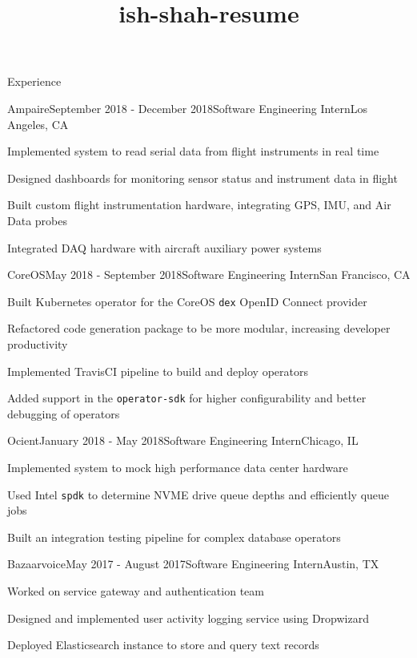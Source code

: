 \documentclass{resume} %
\title{ish-shah-resume}
\begin{document}
    
    \begin{rSection}{Experience}
    
    \begin{rSubsection}{Ampaire}{September 2018 - December 2018}{Software Engineering Intern}{Los Angeles, CA}
    \item Implemented system to read serial data from flight instruments in real time
    \item Designed dashboards for monitoring sensor status and instrument data in flight
    \item Built custom flight instrumentation hardware, integrating GPS, IMU, and Air Data probes
    \item Integrated DAQ hardware with aircraft auxiliary power systems
    \end{rSubsection}
    
    \begin{rSubsection}{CoreOS}{May 2018 - September 2018}{Software Engineering Intern}{San Francisco, CA}
    \item Built Kubernetes operator for the CoreOS \verb+dex+ OpenID Connect provider
    \item Refactored code generation package to be more modular, increasing developer productivity 
    \item Implemented TravisCI pipeline to build and deploy operators
    \item Added support in the \verb+operator-sdk+ for higher configurability and better debugging of operators
    \end{rSubsection}
    
    \begin{rSubsection}{Ocient}{January 2018 - May 2018}{Software Engineering Intern}{Chicago, IL}
    \item Implemented system to mock high performance data center hardware
    \item Used Intel \verb+spdk+ to determine NVME drive queue depths and efficiently queue jobs 
    \item Built an integration testing pipeline for complex database operators    
    \end{rSubsection}
    
    \begin{rSubsection}{Bazaarvoice}{May 2017 - August 2017}{Software Engineering Intern}{Austin, TX}
    \item Worked on service gateway and authentication team
    \item Designed and implemented user activity logging service using Dropwizard
    \item Deployed Elasticsearch instance to store and query text records
    \end{rSubsection}
    

\end{rSection}
\end{document}
